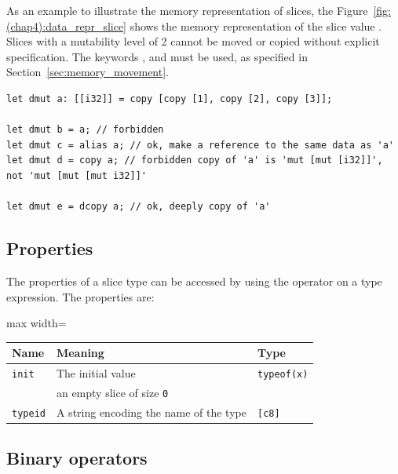 As an example to illustrate the memory representation of slices, the
Figure~\ref{fig:(chap4):data_repr_slice} shows the memory representation of the slice
value . Slices with a mutability level of 2
cannot be moved or copied without explicit specification. The keywords
,  and  must be used, as specified in
Section~\ref{sec:memory_movement}.

\begin{lstlisting}[style=coloredverbatimError]
let dmut a: [[i32]] = copy [copy [1], copy [2], copy [3]];

let dmut b = a; // forbidden
let dmut c = alias a; // ok, make a reference to the same data as 'a'
let dmut d = copy a; // forbidden copy of 'a' is 'mut [mut [i32]]', not 'mut [mut [mut i32]]'

let dmut e = dcopy a; // ok, deeply copy of 'a'
\end{lstlisting}



\subsection{Properties}

The properties of a slice type can be accessed by using the \token{::} operator on a type expression. The properties are:

\begin{center}\begin{adjustbox}{max width=\linewidth}
  \begin{tabular}{|l|ll|}
    \hline
    Name & Meaning & Type\\
    \hline
    \hline
    \texttt{init} & The initial value & \texttt{typeof(x)}\\
    & an empty slice of size \texttt{0} & \\
    \hline
    \texttt{typeid} & A string encoding the name of the type & \texttt{[c8]} \\
    \hline
  \end{tabular}
\end{adjustbox}\end{center}

\subsection{Binary operators}

